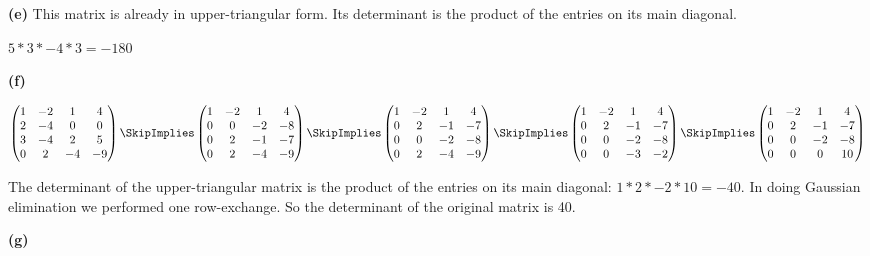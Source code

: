 \documentclass[oneside,12pt]{amsart}
\begin{document}
\textbf{(e)} This matrix is already in upper-triangular form. Its determinant
is the product of the entries on its main diagonal.

$5*3*-4*3 = -180$

\bigskip

\textbf{(f)}

\bigskip

$
\begin{pmatrix}
1 & -2 & 1 & 4 \\
2 & -4 & 0 & 0 \\
3 & -4 & 2 & 5 \\
0 & 2 & -4 & -9
\end{pmatrix}
\SkipImplies
\begin{pmatrix}
1 & -2 & 1 & 4 \\
0 & 0 & -2 & -8 \\
0 & 2 & -1 & -7 \\
0 & 2 & -4 & -9
\end{pmatrix}
\SkipImplies
\begin{pmatrix}
1 & -2 & 1 & 4 \\
0 & 2 & -1 & -7 \\
0 & 0 & -2 & -8 \\
0 & 2 & -4 & -9
\end{pmatrix}
\SkipImplies
\begin{pmatrix}
1 & -2 & 1 & 4 \\
0 & 2 & -1 & -7 \\
0 & 0 & -2 & -8 \\
0 & 0 & -3 & -2
\end{pmatrix}
\SkipImplies
\begin{pmatrix}
1 & -2 & 1 & 4 \\
0 & 2 & -1 & -7 \\
0 & 0 & -2 & -8 \\
0 & 0 & 0 & 10
\end{pmatrix}
$

The determinant of the upper-triangular matrix is the product of the
entries on its main diagonal: $1*2*-2*10=-40$. In doing Gaussian elimination
we performed one row-exchange. So the determinant of the original matrix is 40.


\bigskip

\textbf{(g)}

\bigskip
\end{document}
